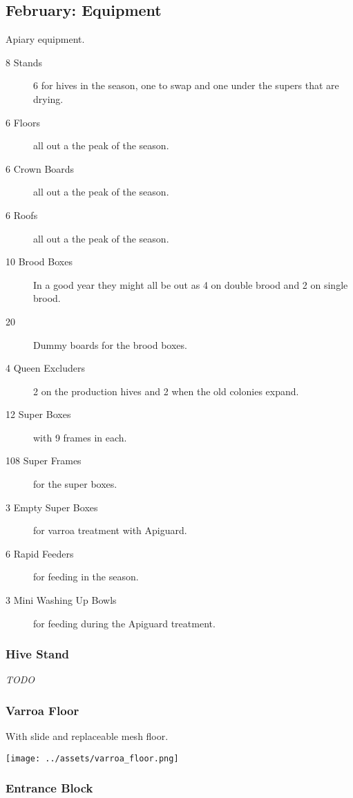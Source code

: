 \subsection{February: Equipment}

Apiary equipment.

\begin{description}
    \item[8 Stands] 6 for hives in the season, one to swap and one under the supers that are drying.
    \item[6 Floors] all out a the peak of the season.
    \item[6 Crown Boards] all out a the peak of the season.
    \item[6 Roofs] all out a the peak of the season.
    \item[10 Brood Boxes] In a good year they might all be out as 4 on double brood and 2 on single brood.
    \item[20] Dummy boards for the brood boxes.
    \item[4 Queen Excluders] 2 on the production hives and 2 when the old colonies expand.
    \item[12 Super Boxes] with 9 frames in each.
    \item[108 Super Frames] for the super boxes.
    \item[3 Empty Super Boxes] for varroa treatment with Apiguard.
    \item[6 Rapid Feeders] for feeding in the season.
    \item[3 Mini Washing Up Bowls] for feeding during the Apiguard treatment.
\end{description}

\subsubsection{Hive Stand}

\emph{TODO}

\subsubsection{Varroa Floor}

With slide and replaceable mesh floor.

\texttt{[image: ../assets/varroa\_floor.png]}

\subsubsection{Entrance Block}

